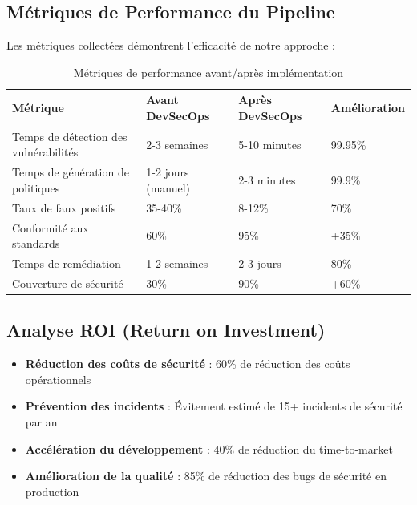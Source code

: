 \documentclass[12pt,a4paper]{report}
\begin{document}
\subsection{Métriques de Performance du Pipeline}

Les métriques collectées démontrent l'efficacité de notre approche :

\begin{table}[H]
    \centering
    \begin{tabularx}{\textwidth}{|X|X|X|X|}
        \hline
        \textbf{Métrique} & \textbf{Avant DevSecOps} & \textbf{Après DevSecOps} & \textbf{Amélioration} \\
        \hline
        Temps de détection des vulnérabilités & 2-3 semaines & 5-10 minutes & 99.95\% \\
        \hline
        Temps de génération de politiques & 1-2 jours (manuel) & 2-3 minutes & 99.9\% \\
        \hline
        Taux de faux positifs & 35-40\% & 8-12\% & 70\% \\
        \hline
        Conformité aux standards & 60\% & 95\% & +35\% \\
        \hline
        Temps de remédiation & 1-2 semaines & 2-3 jours & 80\% \\
        \hline
        Couverture de sécurité & 30\% & 90\% & +60\% \\
        \hline
    \end{tabularx}
    \caption{Métriques de performance avant/après implémentation}
\end{table}

\subsection{Analyse ROI (Return on Investment)}

\begin{itemize}
    \item \textbf{Réduction des coûts de sécurité} : 60\% de réduction des coûts opérationnels
    \item \textbf{Prévention des incidents} : Évitement estimé de 15+ incidents de sécurité par an
    \item \textbf{Accélération du développement} : 40\% de réduction du time-to-market
    \item \textbf{Amélioration de la qualité} : 85\% de réduction des bugs de sécurité en production
\end{itemize}
\end{document}
